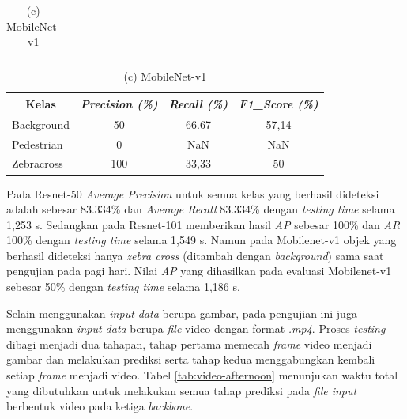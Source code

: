 \begin{table}[!h]
\begin{minipage}[b]{\textwidth}
\begin{tabular}{|l|c|c|c|}
		\end{tabular}
	\end{minipage}
	\vfill
	\begin{minipage}[b]{\textwidth}
		\centering
		\caption*{(c) MobileNet-v1}
		\begin{tabular}{|l|c|c|c|}
			\hline
			\multicolumn{1}{|c|}{\textbf{Kelas}} & \textit{\textbf{Precision (\%)}} & \textit{\textbf{Recall (\%)}} & \textit{\textbf{F1\_Score (\%)}} \\ \hline
			Background                           & 50                               & 66.67                         & 57,14                            \\ \hline
			Pedestrian                           & 0                                & NaN                           & NaN                              \\ \hline
			Zebracross                           & 100                               & 33,33                            & 50                               \\ \hline
			
		\end{tabular}
	\end{minipage}
	\label{tab:evaluate-afternoon}
\end{table}

Pada Resnet-50 \textit{Average Precision} untuk semua kelas yang berhasil dideteksi adalah sebesar 83.334\% dan \textit{Average Recall} 83.334\% dengan \textit{testing time} selama 1,253 s. Sedangkan pada Resnet-101 memberikan hasil \textit{AP} sebesar 100\% dan \textit{AR} 100\% dengan \textit{testing time} selama 1,549 s. Namun pada Mobilenet-v1 objek yang berhasil dideteksi hanya \textit{zebra cross} (ditambah dengan \textit{background}) sama saat pengujian pada pagi hari. Nilai \textit{AP} yang dihasilkan pada evaluasi Mobilenet-v1 sebesar 50\% dengan \textit{testing time} selama 1,186 s.

Selain menggunakan \textit{input data} berupa gambar, pada pengujian ini juga menggunakan \textit{input data} berupa \textit{file} video dengan format \textit{.mp4}. Proses \textit{testing} dibagi menjadi dua tahapan, tahap pertama memecah \textit{frame} video menjadi gambar dan melakukan prediksi serta tahap kedua menggabungkan kembali setiap \textit{frame} menjadi video. Tabel \ref{tab:video-afternoon} menunjukan waktu total yang dibutuhkan untuk melakukan semua tahap prediksi pada \textit{file input} berbentuk video pada ketiga \textit{backbone}.

